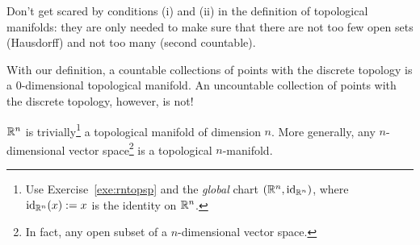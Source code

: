 Don't get scared by conditions (i) and (ii) in the definition of topological manifolds: they are only needed to make sure that there are not too few open sets (Hausdorff) and not too many (second countable).

\begin{example}
	With our definition, a countable collections of points with the discrete topology is a $0$-dimensional topological manifold.
	An uncountable collection of points with the discrete topology, however, is not!
\end{example}

\begin{example}
	$\mathbb{R}^n$ is trivially\footnote{Use Exercise~\ref{exe:rntopsp} and the \emph{global} chart $(\mathbb{R}^n, \operatorname{id}_{\mathbb{R}^n})$, where $\operatorname{id}_{\mathbb{R}^n}(x) := x$ is the identity on $\mathbb{R}^n$.} a topological manifold of dimension $n$.
	More generally, any $n$-dimensional vector space\footnote{In fact, any open subset of a $n$-dimensional vector space.} is a topological $n$-manifold.
\end{example}

